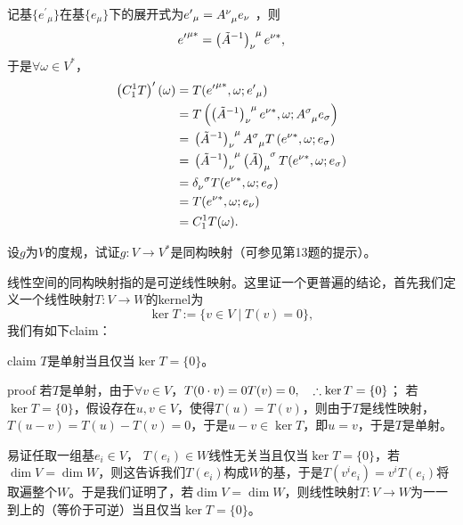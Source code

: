 \begin{xiti}
    \begin{zm}
    	记基$ \{{e^\prime}_\mu \} $在基$\{e_\mu \}$下的展开式为${e^\prime}_\mu = \tensor{A}{^{\nu}_{\mu}}e_\nu $ ，则$${e^\prime}^{\mu*}=\tensor{\left(\tilde{A}^{-1} \right)}{_{\nu}^{\mu} } e^{\nu *} ,$$于是$\forall \omega\in V^* $，
    	\begin{align*}
    	\left(C_1^1 T\right)^\prime (\omega)=&\;  T({e^\prime}^{\mu*},\omega;{e^\prime}_\mu)\\
    	=&\; T\left(\tensor{\left(\tilde{A}^{-1} \right)}{_{\nu}^{\mu} } e^{\nu*},\omega;\tensor{A}{ ^{\sigma}_{\mu} } e_{\sigma} \right)\\
    	=&\;\tensor{\left(\tilde{A}^{-1} \right)}{_{\nu}^{\mu} } \tensor{A}{^{\sigma}_{\mu}} T\left( e^{\nu*},\omega;e_\sigma \right)\\
    	=&\;\tensor{\left(\tilde{A}^{-1} \right)}{_{\nu}^{\mu} } \tensor{\left( \tilde{A} \right)}{ _{\mu}^{\sigma} } T(e^{\nu*},\omega;e_\sigma)\\
    	=&\; \tensor{\delta}{_{\nu}^{\sigma}} T(e^{\nu*},\omega;e_\sigma)\\
    	=&\; T(e^{\nu*},\omega;e_\nu)\\
    	=&\; C_1^1 T(\omega).
    	\end{align*}
    \end{zm}

    \item 设$g$为$V$的度规，试证$ g\colon V\rightarrow V^* $是同构映射（可参见第13题的提示）。

    \begin{zm}
    	线性空间的同构映射指的是可逆线性映射。这里证一个更普遍的结论，首先我们定义一个线性映射$T\colon V\rightarrow W $的kernel为$$ \ker T:=\{ v\in V\mid T(v)=0 \}, $$我们有如下claim：
    	\begin{yl}{claim}
    		$T$是单射当且仅当$\ker T=\{0\}$。
    	\end{yl}
        \begin{yl}{proof}
        	若$T$是单射，由于$\forall v\in V$，$T(0\cdot v)=0T(v)=0\qc \therefore \ker T=\{0\} $；
        	若$\ker T=\{0\}$，假设存在$u,v\in V$，使得$T(u)=T(v)$，则由于$T$是线性映射，$T(u-v)=T(u)-T(v)=0$，于是$u-v \in \ker T $，即$u=v $，于是$T$是单射。
        \end{yl}
        易证任取一组基$e_i\in V $， $T(e_i)\in W$线性无关当且仅当$\ker T=\{0\} $，若$\dim V=\dim W $，则这告诉我们$T(e_i) $构成$W$的基，于是$T(v^i e_i)=v^i T(e_i)$将取遍整个$W$。于是我们证明了，若$\dim V=\dim W$，则线性映射$T\colon V\rightarrow W$为一一到上的（等价于可逆）当且仅当$\ker T=\{0\}$。


\end{zm}
\end{xiti}
